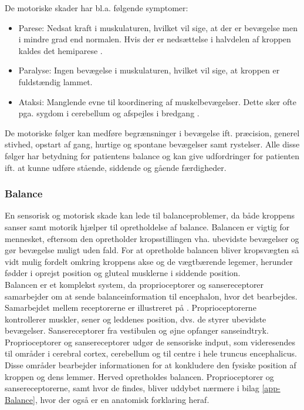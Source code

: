 \noindent De motoriske skader har bl.a. følgende symptomer:
\begin{itemize}
  \item Parese: Nedsat kraft i muskulaturen, hvilket vil sige, at der er bevægelse men i mindre grad end normalen. Hvis der er nedsættelse i halvdelen af kroppen kaldes det hemiparese \cite{Kruuse2015a}.
  \item Paralyse: Ingen bevægelse i muskulaturen, hvilket vil sige, at kroppen er fuldstændig lammet. \cite{Vistrup2015}
  \item Ataksi: Manglende evne til koordinering af muskelbevægelser. Dette sker ofte pga. sygdom i cerebellum og afspejles i bredgang \cite{Redaktionen2015a}. 
\end{itemize}
De motoriske følger kan medføre begrænsninger i bevægelse ift. præcision, generel stivhed, opstart af gang, hurtige og spontane bevægelser samt rystelser. Alle disse følger har betydning for patientens balance og kan give udfordringer for patienten ift. at kunne udføre stående, siddende og gående færdigheder. \cite{Kruuse2015a,DSfA2009} \\

\subsubsection{Balance}
En sensorisk og motorisk skade kan lede til balanceproblemer, da både kroppens sanser samt motorik hjælper til opretholdelse af balance. Balancen er vigtig for mennesket, eftersom den opretholder kropsstillingen vha. ubevidste bevægelser og gør bevægelse muligt uden fald. For at opretholde balancen bliver kropsvægten så vidt mulig fordelt omkring kroppens akse og de vægtbærende legemer, herunder fødder i oprejst position og gluteal musklerne i siddende position. \cite{Nichols1997} \\
Balancen er et komplekst system, da proprioceptorer og sansereceptorer samarbejder om at sende balanceinformation til encephalon, hvor det bearbejdes. Samarbejdet mellem receptorerne er illustreret på . Proprioceptorerne kontrollerer muskler, sener og leddenes position, dvs. de styrer ubevidste bevægelser. \cite{Martini2012} Sansereceptorer fra vestibulen og øjne opfanger sanseindtryk. Proprioceptorer og sansereceptorer udgør de sensoriske indput, som videresendes til områder i cerebral cortex, cerebellum og til centre i hele truncus encephalicus. Disse områder bearbejder informationen for at konkludere den fysiske position af kroppen og dens lemmer. Herved opretholdes balancen. \cite{Martini2012,Karnath2003} Proprioceptorer og sansereceptorerne, samt hvor de findes, bliver uddybet nærmere i bilag \ref{app-Balance}, hvor der også er en anatomisk forklaring heraf.


